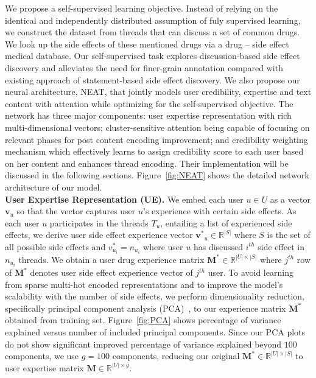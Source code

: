 \documentclass{bmcart}
\begin{document}
We propose a self-supervised learning objective. Instead of relying on the identical and independently distributed assumption of fuly supervised learning, we construct the dataset from threads that can discuss a set of common drugs. We look up the side effects of these mentioned drugs via a drug -- side effect medical database. Our self-supervised task explores discussion-based side effect discovery and alleviates the need for finer-grain annotation compared with existing approach of statement-based side effect discovery.
We also propose our neural architecture, NEAT, that jointly models user credibility, expertise and text content with attention while optimizing for the self-supervised objective.
The network has three major components: user expertise representation with rich multi-dimensional vectors; cluster-sensitive attention being capable of focusing on relevant phases for post content encoding improvement; and credibility weighting mechanism which effectively learns to assign credibility score to each user based on her content and enhances thread encoding. Their implementation will be discussed in the following sections. Figure~\ref{fig:NEAT} shows the detailed network architecture of our model. \\

\textbf{User Expertise Representation (UE).}  We embed each user $u
\in U$ as a vector $\boldsymbol{v}_{u}$ so that the vector captures
user $u$'s experience with certain side effects. As each user $u$
participates in the threads $T_u$, entailing a list of experienced
side effects, we derive user side effect experience vector $\boldsymbol{v^{\ast}}_{u}
\in \mathbb{R}^{|S|}$ where $S$ is the set of all possible side effects and
$v^{\ast}_{u_i}=n_{u_i}$ where user $u$ has discussed $i^{th}$ side effect in $n_{u_i}$ threads. We obtain a user drug experience matrix
$\boldsymbol{M}^{\ast} \in \mathbb{R}^{|U|\times|S|}$ where $j^{th}$
row of $\boldsymbol{M}^{\ast}$ denotes user side effect experience vector of $j^{th}$ user. To avoid learning from sparse multi-hot encoded representations and to improve the model's scalability with the number of side effects, we perform  dimensionality reduction, specifically principal component analysis (PCA)~\cite{jolliffe1986principal}, to our experience matrix $\boldsymbol{M}^{\ast}$ obtained from training set.
Figure~\ref{fig:PCA} shows percentage of variance explained versus
number of included principal components. Since our PCA plots do not show significant improved percentage of variance explained beyond $100$ components, we use $g=100$ components, reducing
our original $\boldsymbol{M}^{\ast}\in \mathbb{R}^{|U|\times|S|}$ to
user expertise matrix $\boldsymbol{M} \in \mathbb{R}^{|U| \times g}$. \\
\end{document}
